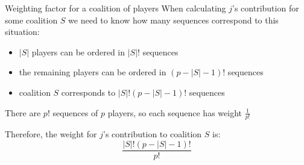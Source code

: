 \begin{frame}{Weighting factor for a coalition of players}
    When calculating $j$'s contribution for some coalition $S$ we need to know how many sequences correspond to this situation:

    \begin{itemize}
        \item $|S|$ players can be ordered in $|S|!$ sequences
        \item the remaining players can be ordered in $(p - |S| - 1)!$ sequences
        \item coalition $S$ corresponds to $|S|!(p - |S| - 1)!$ sequences
    \end{itemize}

    There are $p!$ sequences of $p$ players, so each sequence has weight $\frac{1}{p!}$

    Therefore, the weight for $j$'s contribution to coalition $S$ is:
    $$\frac{|S|!(p - |S| - 1)!}{p!}$$


\end{frame}


